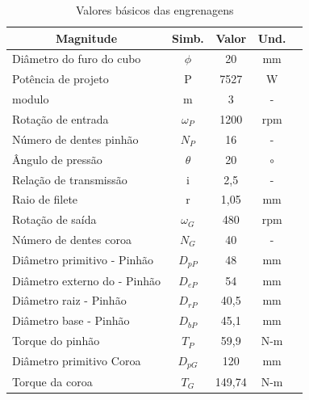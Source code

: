 \documentclass[12pt,a4paper]{article}
\begin{document}
\begin{table}[!htb]
    \centering
\caption{{\label{tab:3} Valores básicos das engrenagens}}
\begin{tabular}{l c c c c}
\hline
\multicolumn{1}{c}{\textbf{Magnitude}}  & \textbf{Simb.}   & \textbf{Valor}  & \textbf{Und.}  \\ \hline
Diâmetro do furo do cubo                & $\phi$           & 20              & mm             \\
Potência de projeto                     & P                & 7527            & W              \\
modulo                                  & m                & 3               & -              \\
Rotação de entrada                      & $\omega_P$       & 1200            & rpm            \\
Número de dentes pinhão                 & $N_P$            & 16              & -              \\
Ângulo de pressão                       & $\theta$         & 20              & $\circ$        \\
Relação de transmissão                  & i                & 2,5             & -              \\
Raio de filete                          & r                & 1,05            & mm             \\
Rotação de saída                        & $\omega_G$       & 480             & rpm            \\
Número de dentes coroa                  & $N_G$            & 40              & -              \\
Diâmetro primitivo - Pinhão             & $D_{pP}$         & 48              & mm             \\
Diâmetro externo do - Pinhão            & $D_{eP}$         & 54              & mm             \\
Diâmetro raiz - Pinhão                  & $D_{rP}$         & 40,5            & mm             \\
Diâmetro base - Pinhão                  & $D_{bP}$         & 45,1            & mm             \\
Torque do pinhão                        & $T_P$            & 59,9            & N-m            \\
Diâmetro primitivo Coroa                & $D_{pG}$         & 120             & mm             \\
Torque da coroa                         & $T_G$            & 149,74          & N-m            \\

\end{tabular}
\end{table}
\end{document}
